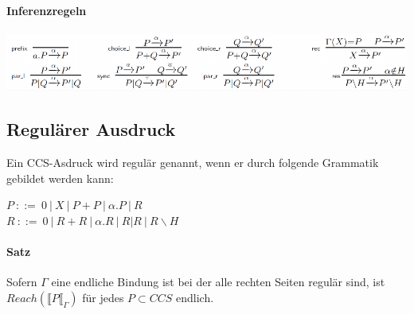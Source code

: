 \documentclass[a4paper,10pt, oneside]{book}
\begin{document}
\paragraph{Inferenzregeln}
\begin{center}
 \includegraphics[scale=0.6]{inferenz_ges}
\end{center}

\subsection{Regulärer Ausdruck}
Ein CCS-Asdruck wird regulär genannt, wenn er durch folgende Grammatik gebildet werden kann:
\begin{center}
 $ P \ ::= \  0 \ | \ X \ | \ P+P \ | \ \alpha.P \ | \ R$\\
 $ R \ ::= \ 0 \ | \ R+R \ |\  \alpha.R  \ | \ R|R \ | \ R\backslash H $
\end{center}

\paragraph{Satz}
Sofern $\Gamma$ eine endliche Bindung ist bei der alle rechten Seiten regulär sind, ist $Reach(\llbracket P \llbracket_{\Gamma})$ für jedes $P \subset CCS$ endlich.
\end{document}
